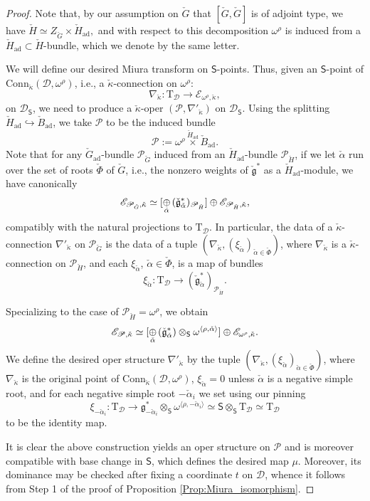 \documentclass{amsart}
\theoremstyle{definition}
\newcommand{\halpha}{\check{\alpha}}
\newcommand{\fg}{\mathfrak{g}}
\newcommand{\sD}{\mathscr{D}}
\newcommand{\Sing}{\mathsf{S}}
\newcommand{\sE}{\mathscr{E}}
\newcommand{\on}{\mathrm}
\newcommand{\sP}{\mathscr{P}}
\newcommand{\ckappa}{\check{\kappa}}
\newcommand{\Conn}{\on{Conn}}
\numberwithin{equation}{section}
\begin{document}
\begin{proof} Note that, by our assumption on $\check{G}$ { that $[\check{G},\check{G}]$ is of adjoint type}, we have $\check{H} \simeq Z_{\check{G}} \times \check{H}_{\on{ad}},$ and with respect to this decomposition $\omega^\rho$ is induced from a $\check{H}_{\on{ad}} \subset \check{H}$-bundle, which we denote by the same letter. 

We will define our desired Miura transform on $\Sing$-points. Thus, given an $\Sing$-point of $\Conn_{\ckappa}(\sD, \omega^\rho)$, i.e., a $\ckappa$-connection on $\omega^\rho$:$$\nabla_{\ckappa}: \on{T}_\sD \rightarrow \mathscr{E}_{\omega^\rho, \ckappa},$$on $\sD_\Sing$, we need to produce a $\ckappa$-oper $(\sP, \nabla'_{\ckappa})$ on $\sD_\Sing$. Using the splitting $\check{H}_{\on{ad}} \hookrightarrow \check{B}_{\on{ad}}$, we take $\sP$ to be the induced bundle 
$$\sP := \omega^\rho \overset{\check{H}_{\on{ad}}} \times \check{B}_{\on{ad}}.$$
Note that for any $\check{G}_{\on{ad}}$-bundle $\sP_{\check{G}}$ induced from an $\check{H}_{\on{ad}}$-bundle $\sP_{\check{H}}$, if we let $\halpha$ run over the set of roots $\check{\Phi}$ of $\check{G}$, i.e., the nonzero weights of $\check{\fg}^*$ as a $\check{H}_{\on{ad}}$-module, we have canonically 
$$\sE_{\sP_{\check{G}}, \ckappa} \simeq   [\underset{\check{\alpha}} \oplus \hspace{.5mm} (\check{\fg}^*_{\check{\alpha}})_{\sP_{\check{H}}}] \oplus \sE_{\sP_{\check{H}}, \ckappa}, $$
compatibly with the natural projections to $\on{T}_{\sD}$. In particular, the data of a $\ckappa$-connection $\nabla'_{\ckappa}$ on $\sP_{\check{G}}$ is the data of a tuple $(\nabla_{\ckappa}, (\xi_{\halpha})_{\halpha \in \check{\Phi}})$, where $\nabla_{\ckappa}$ is a $\ckappa$-connection on $\sP_{\check{H}}$, and each $\xi_{\halpha}$, $\halpha \in \check{\Phi}$, is a map of bundles
$$\xi_{\halpha}: \on{T}_\sD \rightarrow (\check{\fg}^*_{\check{\alpha}})_{\sP_{\check{H}}}.$$


Specializing to the case of $\sP_{\check{H}} = \omega^\rho$, we obtain 
$$\sE_{\sP, \ckappa} \simeq [\underset{\check{\alpha}} \oplus \hspace{.5mm} (\check{\fg}^*_{\check{\alpha}}) \otimes_{\Sing} \omega^{\langle \rho, \halpha \rangle}] \oplus \sE_{\omega^\rho, \ckappa}.$$
We define the desired oper structure $\nabla'_{\ckappa}$ by the tuple $(\nabla_{\ckappa}, (\xi_{\halpha})_{\halpha \in \check{\Phi}})$, where $\nabla_{\ckappa}$ is the original point of $\Conn_{\ckappa}(\sD, \omega^\rho)$,  $\xi_{\halpha} = 0$ unless $\halpha$ is a negative simple root, and for each negative simple root $-\halpha_i$ we set using our pinning
$$\xi_{-\halpha_i}: \on{T}_{\sD} \rightarrow  \fg^*_{-\halpha_i} \otimes_\Sing \omega^{\langle \rho, - \halpha_i \rangle} \simeq \Sing \otimes_\Sing \on{T}_{\sD} \simeq \on{T}_{\sD}$$
to be the identity map.

It is clear the above construction yields an oper structure on $\sP$ and is moreover compatible with base change in $\Sing$, which defines the desired map $\mu$. Moreover, its dominance may be checked after fixing a coordinate $t$ on $\sD$, whence it follows from Step 1 of the proof of Proposition \ref{Prop:Miura_isomorphism}. 
\end{proof}
\end{document}
